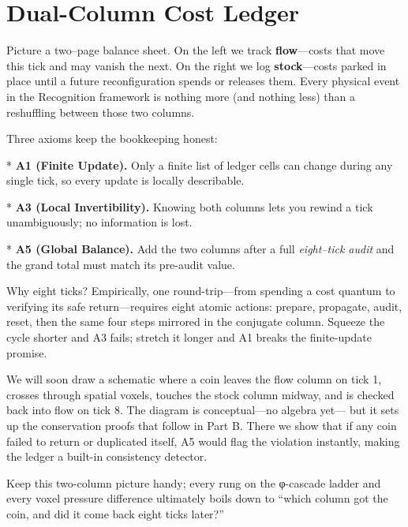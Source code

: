 \documentclass[11pt,oneside]{book}
\begin{document}
\section{Dual-Column Cost Ledger}
\label{sec:dual-ledger}


Picture a two–page balance sheet.  
On the left we track \textbf{flow}—costs that move this tick and may vanish
the next.  
On the right we log \textbf{stock}—costs parked in place until a future
reconfiguration spends or releases them.  Every physical event in the
Recognition framework is nothing more (and nothing less) than a reshuffling
between those two columns.

Three axioms keep the bookkeeping honest:

* \textbf{A1 (Finite Update).} Only a finite list of ledger cells can change
  during any single tick, so every update is locally describable.

* \textbf{A3 (Local Invertibility).} Knowing both columns lets you rewind a
  tick unambiguously; no information is lost.

* \textbf{A5 (Global Balance).} Add the two columns after a full
  \emph{eight–tick audit} and the grand total must match its pre-audit value.

Why eight ticks?  
Empirically, one round-trip—from spending a cost quantum to verifying its safe
return—requires eight atomic actions:  
prepare, propagate, audit, reset, then the same four steps mirrored in the
conjugate column.  Squeeze the cycle shorter and A3 fails; stretch it longer
and A1 breaks the finite-update promise.

We will soon draw a schematic where a coin leaves the flow column on tick 1,
crosses through spatial voxels, touches the stock column midway, and is
checked back into flow on tick 8.  The diagram is conceptual—no algebra yet—
but it sets up the conservation proofs that follow in Part B.  There we show
that if any coin failed to return or duplicated itself, A5 would flag the
violation instantly, making the ledger a built-in consistency detector.

Keep this two-column picture handy; every rung on the φ-cascade ladder and
every voxel pressure difference ultimately boils down to “which column got the
coin, and did it come back eight ticks later?”



\end{document}
